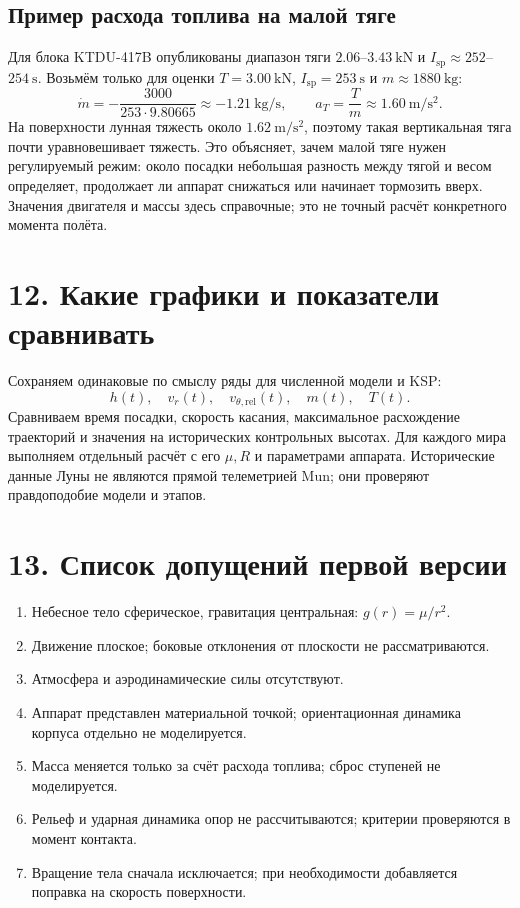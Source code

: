 \documentclass[11pt,a4paper]{article}
\newcommand{\Isp}{I_{\mathrm{sp}}}
\begin{document}
\subsection*{Пример расхода топлива на малой тяге}
Для блока KTDU-417B опубликованы диапазон тяги $2.06$--$3.43\ \mathrm{kN}$ и $\Isp\approx252$--$254\ \mathrm{s}$. Возьмём только для оценки $T=3.00\ \mathrm{kN}$, $\Isp=253\ \mathrm{s}$ и $m\approx1880\ \mathrm{kg}$:
\[
\dot m=-\frac{3000}{253\cdot9.80665}\approx-1.21\ \mathrm{kg/s},\qquad
a_T=\frac{T}{m}\approx1.60\ \mathrm{m/s^2}.
\]
На поверхности лунная тяжесть около $1.62\ \mathrm{m/s^2}$, поэтому такая вертикальная тяга почти уравновешивает тяжесть. Это объясняет, зачем малой тяге нужен регулируемый режим: около посадки небольшая разность между тягой и весом определяет, продолжает ли аппарат снижаться или начинает тормозить вверх. Значения двигателя и массы здесь справочные; это не точный расчёт конкретного момента полёта.

\section{12. Какие графики и показатели сравнивать}
Сохраняем одинаковые по смыслу ряды для численной модели и KSP:
\[
h(t),\quad v_r(t),\quad v_{\theta,\mathrm{rel}}(t),\quad m(t),\quad T(t).
\]
Сравниваем время посадки, скорость касания, максимальное расхождение траекторий и значения на исторических контрольных высотах. Для каждого мира выполняем отдельный расчёт с его $\mu,R$ и параметрами аппарата. Исторические данные Луны не являются прямой телеметрией Mun; они проверяют правдоподобие модели и этапов.

\section{13. Список допущений первой версии}
\begin{enumerate}
\item Небесное тело сферическое, гравитация центральная: $g(r)=\mu/r^2$.
\item Движение плоское; боковые отклонения от плоскости не рассматриваются.
\item Атмосфера и аэродинамические силы отсутствуют.
\item Аппарат представлен материальной точкой; ориентационная динамика корпуса отдельно не моделируется.
\item Масса меняется только за счёт расхода топлива; сброс ступеней не моделируется.
\item Рельеф и ударная динамика опор не рассчитываются; критерии проверяются в момент контакта.
\item Вращение тела сначала исключается; при необходимости добавляется поправка на скорость поверхности.
\end{enumerate}
\end{document}
